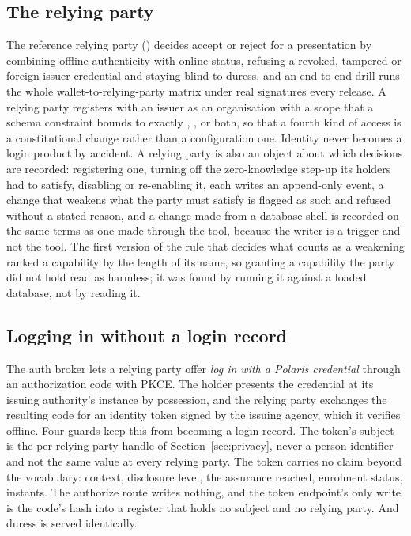\subsection{The relying party}

The reference relying party () decides accept or reject for a
presentation by combining offline authenticity with online status, refusing a revoked, tampered or
foreign-issuer credential and staying blind to duress, and an end-to-end drill runs the whole
wallet-to-relying-party matrix under real signatures every release. A relying party registers with
an issuer as an organisation with a scope that a schema constraint bounds to exactly ,
, or both, so that a fourth kind of access is a constitutional change rather than
a configuration one. Identity never becomes a login product by accident. A
relying party is also an object about which decisions are recorded: registering one, turning off the
zero-knowledge step-up its holders had to satisfy, disabling or re-enabling it, each writes an
append-only event, a change that weakens what the party must satisfy is flagged as such and refused
without a stated reason, and a change made from a database shell is recorded on the same terms as
one made through the tool, because the writer is a trigger and not the tool. The first version of
the rule that decides what counts as a weakening ranked a capability by the length of its name, so
granting a capability the party did not hold read as harmless; it was found by running it against a
loaded database, not by reading it. \sImpl

\subsection{Logging in without a login record}

The auth broker lets a relying party offer \emph{log in with a Polaris credential} through an
authorization code with PKCE. The holder presents the credential at its issuing authority's
instance by possession, and the relying party exchanges the resulting code for an identity token
signed by the issuing agency, which it verifies offline. Four guards keep this from becoming a login
record. The token's subject is the per-relying-party handle of Section~\ref{sec:privacy}, never a
person identifier and not the same value at every relying party. The token
carries no claim beyond the vocabulary: context, disclosure level, the assurance reached, enrolment
status, instants. The authorize route writes nothing, and the token endpoint's only write is the
code's hash into a register that holds no subject and no relying party. And duress is served
identically. \sImpl

